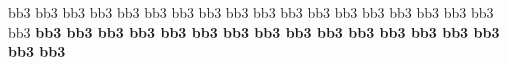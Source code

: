 
%
%
\def\freqbarno{9999}
%
\ifx\medleyflag\relax\else
  \nopagenumbers{}\medtall\medwidewidth\fi
\newpitch\newgrace\noautoglue
%
\relax
%
%
%
\debutmorceau
{}%
\leftrepeatsymbol
\notes\ce\enotes\xbarre
\notes\grg\bstts bb3\bap{\be\grg}\bc\bep\etn
\grg\bstts bb3\bap{\be\grg}\bc\bep\enotes\xbarre
\notes\dble\bstst bb3\bep{\ba\grg}\bfp\ba\etn
\dble\bcst bb3{\be\grg}\bdp\bb\enotes\xbarre
\notes\grg\bstts bb3\bNp{\bd\grg}\bb\bdp\etn
\grg\bstts bb3\bNp{\bd\grg}\bb\bdp\enotes\xbarre
\notes\grg\bstst bb3\bNp{\ba\grg}\bbp\bc\etn
\dbld\bstst bb3\bdp{\bb\dble}\bep\bc\enotes\suspmorceau
%
\reprmorceau
\notes\grg\bstts bb3\bap{\be\grg}\bc\bep\etn
{}\grg\bstts bb3\bap{\be\grg}\bc\bep\rlap{\fsk\Uptext{$\vert$}}\etn
{}\grg\bstst bb3\bap{\be\grg}\bcp\bd\rlap{\fsk\Uptext{$\vert$}}\enotes\xbarre
\notes\dble\bstst bb3\bep{\ba\grg}\bfp\ba\etn
\dble\bcst bb3{\be\grg}\bdp\bc\enotes\xbarre
\notes\grg\btsst bb3\bb{\bdp\gre}{\bNp\grd}\bb\etn
\grh\bstst bb3\bgp{\bf\grg}\bep\bd\enotes\xbarre
\notes\dblc\bcc bb3{\bc\gre}\ba\etn
\wbirl\ca\enotes\setrightrepeat\suspmorceau
%
\reprmorceau
\leftrepeatsymbol
\notes\dble\ce\enotes\xbarre
\notes\grg\btsc bb3\bc{\bep\dblh}\bh\etn
\btsc bb3\bc{\bep\dblh}\bh\enotes\xbarre
\notes\btsst bb3\bc\bep\bhp\bf\etn
\dble\bcst bb3{\be\grg}\bdp\bc\enotes\xbarre
\notes\scatchb\bcc bb3{\bb\dblg}\bg\etn
\tcatchb\bcc bb3{\bb\dblg}\bg\enotes\xbarre
\notes\tcatchb\bcc bb3{\bb\dblg}\bg\etn
\bstst bb3\bhp{\bg\grh}\bfp\bd\enotes\suspmorceau
%
\reprmorceau
\notes\grg\btsc bb3\bc{\bep\dblh}\bh\etn
\btsc bb3{\bg\grh}{\bep\dblh}\bh\enotes\xbarre
\notes\bstst bb3\bgp{\be\grg}\bfp\bd\etn
\dble\bcst bb3{\be\grg}\bdp\bc\enotes\xbarre
\notes\grg\btsst bb3\bb{\bdp\gre}{\bNp\grd}\bb\etn
\grh\bstst bb3\bgp{\bf\grg}\bep\bd\enotes\xbarre
\notes\dblc\bcc bb3{\bc\gre}\ba\etn
\wbirl\ca\enotes\setrightrepeat\suspmorceau
%
\reprmorceau
\leftrepeatsymbol
\notes\dble\ce\enotes\xbarre
\notes\grg\bstst bb3{\bap\grd}{\ba\gre}{\bap\grd}\bc\etn
\grg\bstst bb3{\bap\grd}{\ba\gre}{\bap\grd}\bc\enotes\xbarre
\notes\grg\bstst bb3{\bap\grd}{\ba\gre}{\bap\grd}\bc\etn
\dble\bcst bb3{\be\grg}\bdp\bb\enotes\xbarre
\notes\grg\bstst bb3{\bNp\grd}{\bN\gre}{\bNp\grd}\bb\etn
